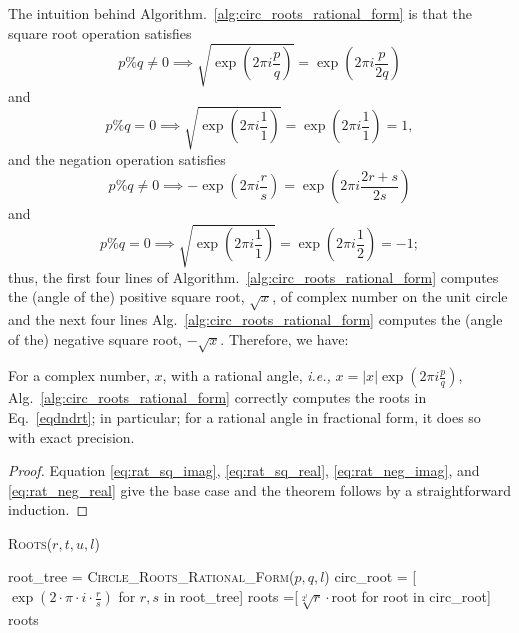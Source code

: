 \documentclass[sigconf]{acmart}
\begin{document}
The intuition behind Algorithm.~\ref{alg:circ_roots_rational_form} is that the square root operation satisfies
\begin{equation}\label{eq:rat_sq_imag}
p \% q \neq  0 \implies   \sqrt{\exp \left(2 \pi i \frac{p}{q}\right)}  = \exp \left(2 \pi i \frac{p}{2q}\right)
\end{equation}
and
\begin{equation}\label{eq:rat_sq_real}
p \% q = 0 \implies   \sqrt{\exp \left(2 \pi i \frac{1}{1}\right)}  = \exp \left(2 \pi i \frac{1}{1}\right) = 1,
\end{equation}
and the negation operation satisfies
\begin{equation}\label{eq:rat_neg_imag}
p \% q \neq  0 \implies   -\exp \left(2 \pi i \frac{r}{s}\right)  = \exp \left(2 \pi i \frac{2r+s} {2s}\right)
\end{equation}
and
\begin{equation}\label{eq:rat_neg_real}
p \% q = 0 \implies   \sqrt{\exp \left(2 \pi i \frac{1}{1}\right)}  = \exp \left(2 \pi i \frac{1}{2}\right) = -1;
\end{equation}
thus, the first four lines of Algorithm.~\ref{alg:circ_roots_rational_form} computes the (angle of the) positive square root, $\sqrt{x}$, of complex number on the unit circle and the next four lines Alg.~\ref{alg:circ_roots_rational_form} computes the (angle of the) negative square root, $-\sqrt{x}$. Therefore, we have:
\begin{theorem}\label{thm:rat_root_correctness}
  For a complex number, $x$, with a rational angle, \emph{i.e.,} $x = |x|\exp \left(2 \pi i \frac{p}{q}\right)$, Alg.~\ref{alg:circ_roots_rational_form} correctly computes the roots in Eq.~\ref{eqdndrt}; in particular; for a rational angle in fractional form, it does so with exact precision.
\end{theorem}
\begin{proof}
Equation \ref{eq:rat_sq_imag}, \ref{eq:rat_sq_real}, \ref{eq:rat_neg_imag}, and \ref{eq:rat_neg_real} give the base case and the theorem follows by a straightforward induction.
\end{proof}


\begin{algorithm}
\caption{\textsc{Roots}($r,t,u,l$)}
\label{alg:roots}
\begin{algorithmic}
\STATE root\_tree = \textsc{Circle\_Roots\_Rational\_Form}($p,q,l$)
\STATE circ\_root = [$\exp\left(2\cdot\pi\cdot i \cdot \frac{r}{s}\right)$ for $r,s$ in root\_tree]
\STATE roots =[$\sqrt[2^l]{r}\cdot$root for root in circ\_root]
\RETURN roots
\end{algorithmic}
\end{algorithm}
\end{document}
